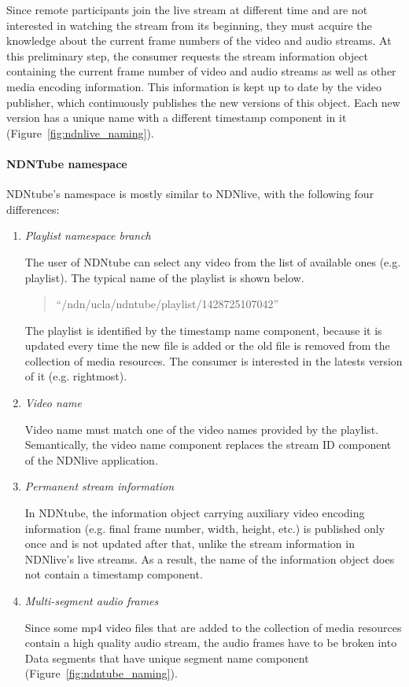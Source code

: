 Since remote participants join the live stream at different time and are not interested in watching the stream from its beginning, they must acquire the knowledge about the current frame numbers of the video and audio streams. At this preliminary step, the consumer requests the stream information object containing the current frame number of video and audio streams as well as other media encoding information. This information is kept up to date by the video publisher, which continuously publishes the new versions of this object. Each new version has a unique name with a different timestamp component in it (Figure~\ref{fig:ndnlive_naming}).


\paragraph{NDNTube namespace} %
\label{par:ndntube_naming}
\vspace{0.3cm}

NDNtube's namespace is mostly similar to NDNlive, with the following four differences:
\begin{enumerate}
	\item{\textit{Playlist namespace branch}} 
		
		The user of NDNtube can select any video from the list of available ones (e.g. playlist). The typical name of the playlist is shown below.
		\begin{quote}
		``/ndn/ucla/ndntube/playlist/1428725107042''
		\end{quote}
    The playlist is identified by the timestamp name component, because it is updated every time the new file is added or the old file is removed from the collection of media resources. The consumer is interested in the latests version of it (e.g. rightmost).
    
	\item{\textit{Video name}} 

		Video name must match one of the video names provided by the playlist. Semantically, the video name component replaces the stream ID component of the NDNlive application.

	\item{\textit{Permanent stream information}} 

    In NDNtube, the information object carrying auxiliary video encoding information (e.g. final frame number, width, height, etc.) is published only once and is not updated after that, unlike the stream information in NDNlive's live streams. As a result, the name of the information object does not contain a timestamp component.

	\item{\textit{Multi-segment audio frames}} 
	
   Since some mp4 video files that are added to the collection of media resources contain a high quality audio stream, the audio frames have to be broken into Data segments that have unique segment name component (Figure~\ref{fig:ndntube_naming}).
\end{enumerate}

